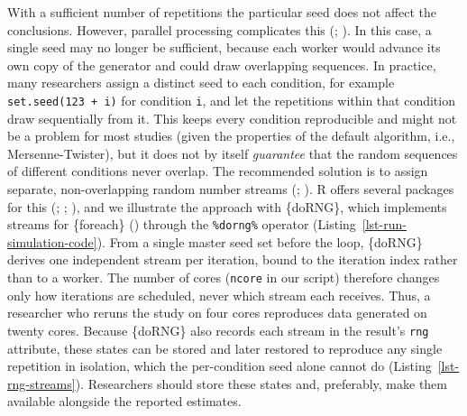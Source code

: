 \documentclass[
  man,
  longtable,
  nolmodern,
  notxfonts,
  notimes,
  colorlinks=true,linkcolor=blue,citecolor=blue,urlcolor=blue]{apa7}
\begin{document}
With a sufficient number of repetitions the particular seed does not
affect the conclusions. However, parallel processing complicates this
(;
). In this case, a
single seed may no longer be sufficient, because each worker would
advance its own copy of the generator and could draw overlapping
sequences. In practice, many researchers assign a distinct seed to each
condition, for example \texttt{set.seed(123\ +\ i)} for condition
\texttt{i}, and let the repetitions within that condition draw
sequentially from it. This keeps every condition reproducible and might
not be a problem for most studies (given the properties of the default
algorithm, i.e., Mersenne-Twister), but it does not by itself
\emph{guarantee} that the random sequences of different conditions never
overlap. The recommended solution is to assign separate, non-overlapping
random number streams (; ). R offers
several packages for this (;
;
), and we illustrate
the approach with \{doRNG\}, which implements streams for \{foreach\}
() through the
\texttt{\%dorng\%} operator (Listing~\ref{lst-run-simulation-code}).
From a single master seed set before the loop, \{doRNG\} derives one
independent stream per iteration, bound to the iteration index rather
than to a worker. The number of cores (\texttt{ncore} in our script)
therefore changes only how iterations are scheduled, never which stream
each receives. Thus, a researcher who reruns the study on four cores
reproduces data generated on twenty cores. Because \{doRNG\} also
records each stream in the result's \texttt{rng} attribute, these states
can be stored and later restored to reproduce any single repetition in
isolation, which the per-condition seed alone cannot do
(Listing~\ref{lst-rng-streams}). Researchers should store these states
and, preferably, make them available alongside the reported estimates.
\end{document}
